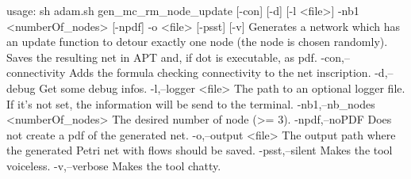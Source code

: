 usage: sh adam.sh gen_mc_rm_node_update [-con] [-d] [-l <file>] -nb1
       <numberOf_nodes> [-npdf] -o <file> [-psst] [-v]
Generates a network which has an update function to detour exactly one
node (the node is chosen randomly). Saves the resulting net in APT and, if
dot is executable, as pdf.
 -con,--connectivity                Adds the formula checking connectivity
                                    to the net inscription.
 -d,--debug                         Get some debug infos.
 -l,--logger <file>                 The path to an optional logger file.
                                    If it's not set, the information will
                                    be send to the terminal.
 -nb1,--nb_nodes <numberOf_nodes>   The desired number of node (>= 3).
 -npdf,--noPDF                      Does not create a pdf of the generated
                                    net.
 -o,--output <file>                 The output path where the generated
                                    Petri net with flows should be saved.
 -psst,--silent                     Makes the tool voiceless.
 -v,--verbose                       Makes the tool chatty.
